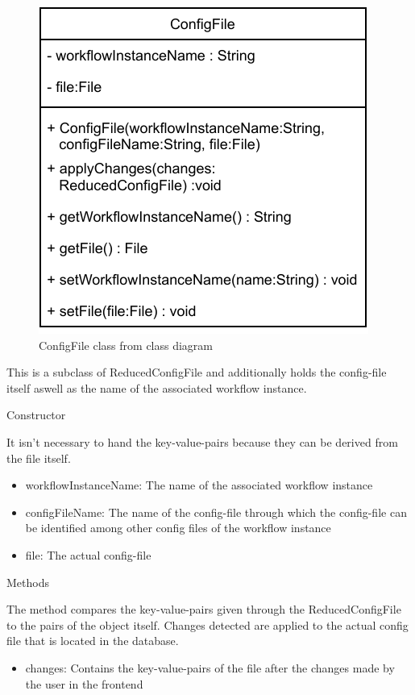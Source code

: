 

\begin{figure}[h]
\centerline{\includegraphics[scale=1]{res/Klassen/ConfigFile.pdf}}
\caption{ConfigFile class from class diagram}
\end{figure}

This is a subclass of ReducedConfigFile and additionally holds the config-file itself aswell as the name of the associated workflow instance.

\begin{methodenv}{Constructor}

It isn't necessary to hand the key-value-pairs because they can be derived from the file itself.

\begin{itemize}
	\item{workflowInstanceName:}
	The name of the associated workflow instance
	\item{configFileName:}
	The name of the config-file through which the config-file can be identified among other config files of the workflow instance
	\item{file:}
	The actual config-file
\end{itemize}
\end{methodenv}

\begin{methodenv}{Methods}


The method compares the key-value-pairs given through the ReducedConfigFile to the pairs of the object itself. Changes detected are applied to the actual config file that is located in the database.

\begin{itemize}
	\item{changes:}
	Contains the key-value-pairs of the file after the changes made by the user in the frontend
\end{itemize}
\end{methodenv}

